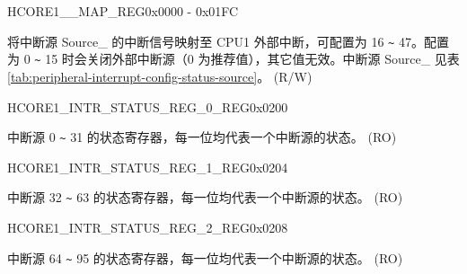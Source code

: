 \begin{register}{H}{CORE1\_\_MAP\_REG}{0x0000 - 0x01FC}\label{regdesc:CORE1SOURCEregindexYMAPREG}
%
%
\regnewline%
\begin{regdesc}\begin{reglist}
\label{fielddesc:CORE1CORE1LPWDTINTMAP}\item [CORE1\_SOURCE\_\regindex{Y}\_MAP] 将中断源 Source\_ 的中断信号映射至 CPU1 外部中断，可配置为 16 \verb+~+ 47。配置为 0 \verb+~+ 15 时会关闭外部中断源（0 为推荐值），其它值无效。中断源 Source\_ 见表 \ref{tab:peripheral-interrupt-config-status-source}。  (R/W)
\end{reglist}\end{regdesc}
\end{register}



\begin{register}{H}{CORE1\_INTR\_STATUS\_REG\_0\_REG}{0x0200}\label{regdesc:CORE1INTRSTATUSREG0REG}
%
\regnewline%
\begin{regdesc}\begin{reglist}
\label{fielddesc:CORE1CORE1INTRSTATUS0}\item [CORE1\_INTR\_STATUS\_0] 中断源 0 \verb+~+ 31 的状态寄存器，每一位均代表一个中断源的状态。  (RO)
\end{reglist}\end{regdesc}
\end{register}


\begin{register}{H}{CORE1\_INTR\_STATUS\_REG\_1\_REG}{0x0204}\label{regdesc:CORE1INTRSTATUSREG1REG}
%
\regnewline%
\begin{regdesc}\begin{reglist}
\label{fielddesc:CORE1CORE1INTRSTATUS1}\item [CORE1\_INTR\_STATUS\_1] 中断源 32 \verb+~+ 63 的状态寄存器，每一位均代表一个中断源的状态。 (RO)
\end{reglist}\end{regdesc}
\end{register}


\begin{register}{H}{CORE1\_INTR\_STATUS\_REG\_2\_REG}{0x0208}\label{regdesc:CORE1INTRSTATUSREG2REG}
%
\regnewline%
\begin{regdesc}\begin{reglist}
\label{fielddesc:CORE1CORE1INTRSTATUS2}\item [CORE1\_INTR\_STATUS\_2] 中断源 64 \verb+~+ 95 的状态寄存器，每一位均代表一个中断源的状态。 (RO)
\end{reglist}\end{regdesc}
\end{register}


